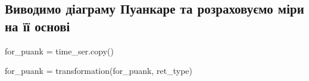 \documentclass[
  letterpaper,
]{report}
\newenvironment{Shaded}{\begin{snugshade}}{\end{snugshade}}
\newcommand{\NormalTok}[1]{\textcolor[rgb]{0.00,0.23,0.31}{#1}}
\newcommand{\OperatorTok}[1]{\textcolor[rgb]{0.37,0.37,0.37}{#1}}
\begin{document}
\hypertarget{ux432ux438ux432ux43eux434ux438ux43cux43e-ux434ux456ux430ux433ux440ux430ux43cux443-ux43fux443ux430ux43dux43aux430ux440ux435-ux442ux430-ux440ux43eux437ux440ux430ux445ux43eux432ux443ux454ux43cux43e-ux43cux456ux440ux438-ux43dux430-ux457ux457-ux43eux441ux43dux43eux432ux456}{%
\subsection{Виводимо діаграму Пуанкаре та розраховуємо міри на її
основі}\label{ux432ux438ux432ux43eux434ux438ux43cux43e-ux434ux456ux430ux433ux440ux430ux43cux443-ux43fux443ux430ux43dux43aux430ux440ux435-ux442ux430-ux440ux43eux437ux440ux430ux445ux43eux432ux443ux454ux43cux43e-ux43cux456ux440ux438-ux43dux430-ux457ux457-ux43eux441ux43dux43eux432ux456}}

\begin{Shaded}
\begin{Highlighting}[]
\NormalTok{for\_puank }\OperatorTok{=}\NormalTok{ time\_ser.copy()}

\NormalTok{for\_puank }\OperatorTok{=}\NormalTok{ transformation(for\_puank, ret\_type)}
\end{Highlighting}
\end{Shaded}
\end{document}
